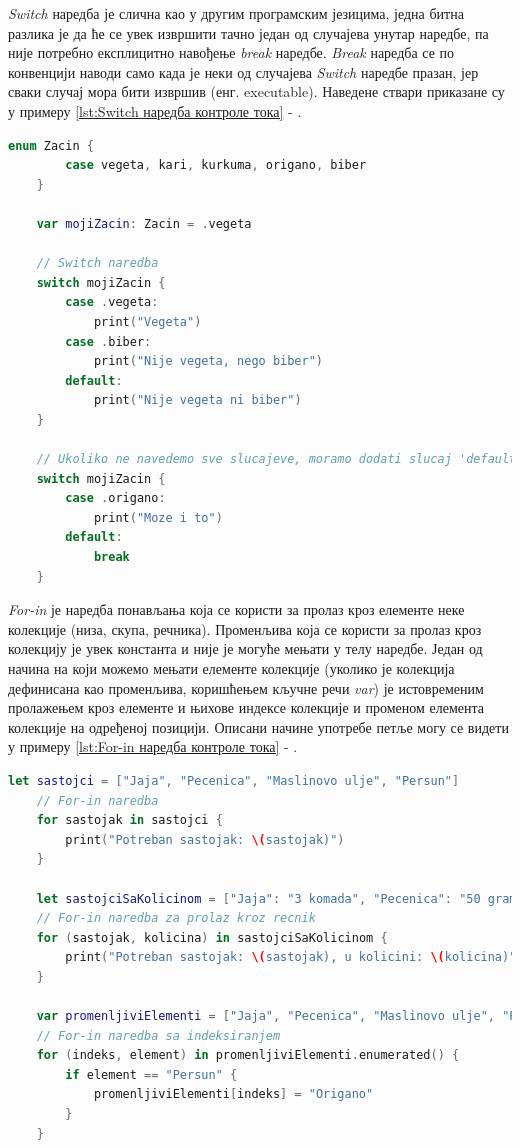 \documentclass[12pt,oneside]{memoir}
\begin{document}
\indent \textit{Switch} наредба је слична као у другим програмским језицима, једна битна разлика је да ће се увек извршити тачно један од случајева унутар наредбе, па није потребно експлицитно навођење \textit{break} наредбе. \textit{Break} наредба се по конвенцији наводи само када је неки од случајева \textit{Switch} наредбе празан, јер сваки случај мора бити извршив (енг. executable). Наведене ствари приказане су у примеру \ref{lst:Switch наредба контроле тока} - .

\begin{lstlisting}[caption=\textit{{Switch наредба контроле тока}}, label={lst:Switch наредба контроле тока}, language=Swift, frame=single]
    enum Zacin {
        case vegeta, kari, kurkuma, origano, biber
    }
    
    var mojiZacin: Zacin = .vegeta
    
    // Switch naredba
    switch mojiZacin {
        case .vegeta:
            print("Vegeta")
        case .biber:
            print("Nije vegeta, nego biber")
        default:
            print("Nije vegeta ni biber")
    }
    
    // Ukoliko ne navedemo sve slucajeve, moramo dodati slucaj 'default' slucaj
    switch mojiZacin {
        case .origano:
            print("Moze i to")
        default:
            break
    }
\end{lstlisting}

\indent \textit{For-in} је наредба понављања која се користи за пролаз кроз елементе неке колекције (низа, скупа, речника). Променљива која се користи за пролаз кроз колекцију је увек константа и није је могуће мењати у телу наредбе. Један од начина на који можемо мењати елементе колекције (уколико је колекција дефинисана као променљива, коришћењем кључне речи \textit{var}) је истовременим пролажењем кроз елементе и њихове индексе колекције и променом елемента колекције на одређеној позицији. Описани начине употребе петље могу се видети у примеру \ref{lst:For-in наредба контроле тока} - .
\begin{lstlisting}[caption=\textit{{For-in наредбa контроле тока}}, label={lst:For-in наредба контроле тока}, language=Swift, frame=single]
    let sastojci = ["Jaja", "Pecenica", "Maslinovo ulje", "Persun"]
    // For-in naredba
    for sastojak in sastojci {
        print("Potreban sastojak: \(sastojak)")
    }
    
    let sastojciSaKolicinom = ["Jaja": "3 komada", "Pecenica": "50 grama", "Maslinovo ulje": "Koliko je potrebno da pokrije tiganj", "Persun": "Prstohvat"]
    // For-in naredba za prolaz kroz recnik
    for (sastojak, kolicina) in sastojciSaKolicinom {
        print("Potreban sastojak: \(sastojak), u kolicini: \(kolicina)")
    }
    
    var promenljiviElementi = ["Jaja", "Pecenica", "Maslinovo ulje", "Persun"]
    // For-in naredba sa indeksiranjem
    for (indeks, element) in promenljiviElementi.enumerated() {
        if element == "Persun" {
            promenljiviElementi[indeks] = "Origano"
        }
    } 
\end{lstlisting}
\end{document}
